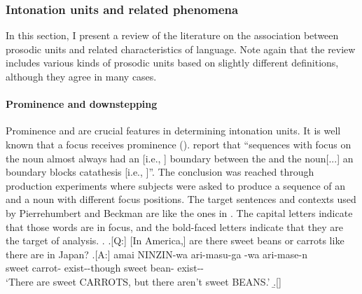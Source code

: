 

\subsubsection{Intonation units and related phenomena}

In this section,
I present a review of the literature on the association between prosodic units and related characteristics of language.
Note again that
the review includes various kinds of prosodic units
based on slightly different definitions,
although they agree in many cases.

\paragraph{Prominence and downstepping}

Prominence and  are crucial features in determining intonation units.
It is well known that
a focus receives prominence ().
 report that
``sequences with focus on the noun almost always had an  [i.e., ] boundary between the  and the noun[...] an  boundary blocks catathesis [i.e., ]''. The conclusion was reached through production experiments where subjects were asked to produce a sequence of an  and a noun with different focus positions.
The target sentences and contexts used by Pierrehumbert and Beckman are like the ones in \Next.
The capital letters indicate that those words are in focus, and
the bold-faced letters indicate that they are the target of analysis.
%
%
\ex.
 \a.[Q:] [In America,] are there sweet beans or carrots like there are in Japan?
 \bg.[A:] amai {NINZIN}-wa ari-masu-ga  -wa ari-mase-n \\
          sweet carrot- exist--though sweet bean- exist-- \\
      `There are sweet CARROTS, but there aren't sweet BEANS.'
 \b.[]   \hfill{\cite[59]{pierrehumbertbeckman88}}

